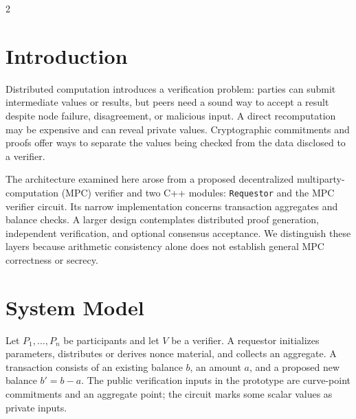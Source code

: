 \documentclass[10pt,letterpaper]{article}
\newcommand{\figstep}[1]{\tikz[baseline=(X.base)]\node[draw=black!55,rounded corners=2pt,fill=black!3,inner sep=5pt,text width=0.85\columnwidth,align=center,minimum height=0.34in] (X) {\footnotesize #1};}
\begin{document}
\begin{multicols}{2}

\section{Introduction}
Distributed computation introduces a verification problem: parties can submit intermediate values or results, but peers need a sound way to accept a result despite node failure, disagreement, or malicious input. A direct recomputation may be expensive and can reveal private values. Cryptographic commitments and proofs offer ways to separate the values being checked from the data disclosed to a verifier.

The architecture examined here arose from a proposed decentralized multiparty-computation (MPC) verifier and two C++ modules: \texttt{Requestor} and the MPC verifier circuit. Its narrow implementation concerns transaction aggregates and balance checks. A larger design contemplates distributed proof generation, independent verification, and optional consensus acceptance. We distinguish these layers because arithmetic consistency alone does not establish general MPC correctness or secrecy.

\section{System Model}
Let $P_1,\ldots,P_n$ be participants and let $V$ be a verifier. A requestor initializes parameters, distributes or derives nonce material, and collects an aggregate. A transaction consists of an existing balance $b$, an amount $a$, and a proposed new balance $b'=b-a$. The public verification inputs in the prototype are curve-point commitments and an aggregate point; the circuit marks some scalar values as private inputs.

\begin{center}
\begin{minipage}{\columnwidth}
\centering
{}
\label{fig:mpcflow}
\end{minipage}
\end{center}


\end{multicols}
\end{document}
